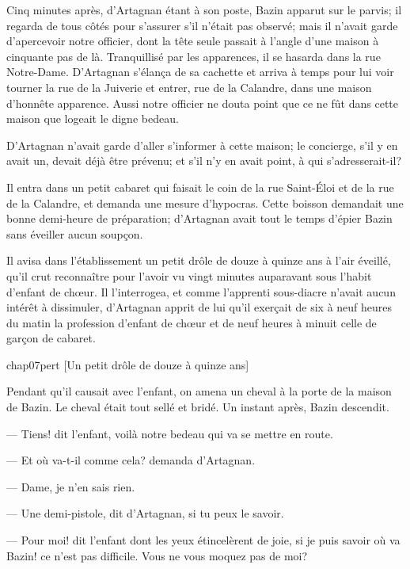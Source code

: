 Cinq minutes après, d'Artagnan étant à son poste, Bazin apparut sur le parvis; il regarda de tous côtés pour s'assurer s'il n'était pas observé; mais il n'avait garde d'apercevoir notre officier, dont la tête seule passait à l'angle d'une maison à cinquante pas de là. Tranquillisé par les apparences, il se hasarda dans la rue Notre-Dame. D'Artagnan s'élança de sa cachette et arriva à temps pour lui voir tourner la rue de la Juiverie et entrer, rue de la Calandre, dans une maison d'honnête apparence. Aussi notre officier ne douta point que ce ne fût dans cette maison que logeait le digne bedeau.

D'Artagnan n'avait garde d'aller s'informer à cette maison; le concierge, s'il y en avait un, devait déjà être prévenu; et s'il n'y en avait point, à qui s'adresserait-il?

Il entra dans un petit cabaret qui faisait le coin de la rue Saint-Éloi et de la rue de la Calandre, et demanda une mesure d'hypocras. Cette boisson demandait une bonne demi-heure de préparation; d'Artagnan avait tout le temps d'épier Bazin sans éveiller aucun soupçon.

Il avisa dans l'établissement un petit drôle de douze à quinze ans à l'air éveillé, qu'il crut reconnaître pour l'avoir vu vingt minutes auparavant sous l'habit d'enfant de chœur. Il l'interrogea, et comme l'apprenti sous-diacre n'avait aucun intérêt à dissimuler, d'Artagnan apprit de lui qu'il exerçait de six à neuf heures du matin la profession d'enfant de chœur et de neuf heures à minuit celle de garçon de cabaret.


\begin{bwbigpic}
	[\basicscale] 
	{chap07pert}
	[Un petit drôle de douze à quinze ans]
\end{bwbigpic}

Pendant qu'il causait avec l'enfant, on amena un cheval à la porte de la maison de Bazin. Le cheval était tout sellé et bridé. Un instant après, Bazin descendit.

— Tiens! dit l'enfant, voilà notre bedeau qui va se mettre en route.

— Et où va-t-il comme cela? demanda d'Artagnan.

— Dame, je n'en sais rien.

— Une demi-pistole, dit d'Artagnan, si tu peux le savoir.

— Pour moi! dit l'enfant dont les yeux étincelèrent de joie, si je puis savoir où va Bazin! ce n'est pas difficile. Vous ne vous moquez pas de moi?

